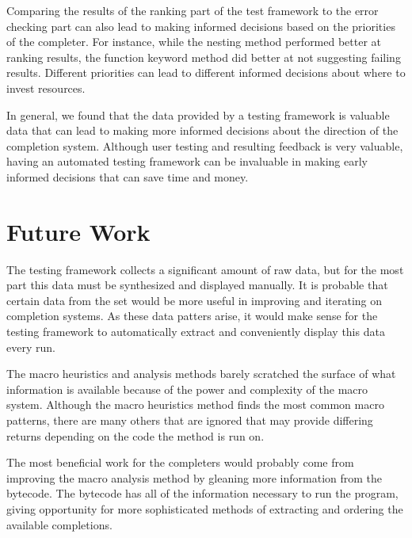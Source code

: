 \documentclass[ms,electronic,twosidetoc,letterpaper,chaptercenter,parttop,lol,lof,lot]{byumsphd}
\begin{document}
Comparing the results of the ranking part of the test framework to the error checking part can also lead to making informed decisions based on the priorities of the completer.
For instance, while the nesting method performed better at ranking results, the function keyword method did better at not suggesting failing results.
Different priorities can lead to different informed decisions about where to invest resources.

In general, we found that the data provided by a testing framework is valuable data that can lead to making more informed decisions about the direction of the completion system.
Although user testing and resulting feedback is very valuable, having an automated testing framework can be invaluable in making early informed decisions that can save time and money.

\section{Future Work}

The testing framework collects a significant amount of raw data, but for the most part this data must be synthesized and displayed manually.
It is probable that certain data from the set would be more useful in improving and iterating on completion systems.
As these data patters arise, it would make sense for the testing framework to automatically extract and conveniently display this data every run.

The macro heuristics and analysis methods barely scratched the surface of what information is available because of the power and complexity of the macro system.
Although the macro heuristics method finds the most common macro patterns, there are many others that are ignored that may provide differing returns depending on the code the method is run on.

The most beneficial work for the completers would probably come from improving the macro analysis method by gleaning more information from the bytecode.
The bytecode has all of the information necessary to run the program, giving opportunity for more sophisticated methods of extracting and ordering the available completions.



\end{document}
